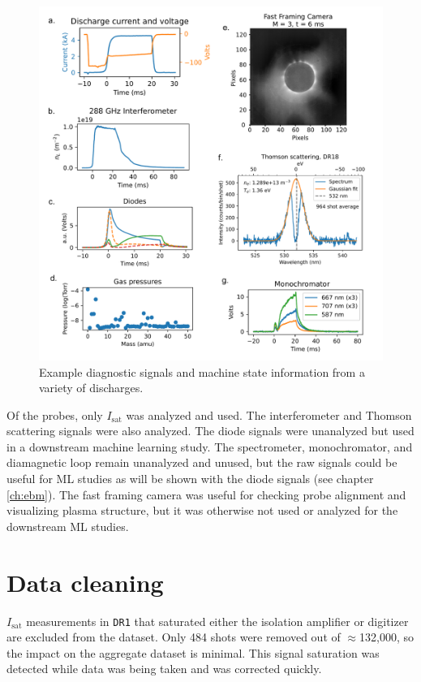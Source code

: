 \begin{figure}
	\centering
	\includegraphics[width=450pt]{figures/diagnostics-examples.pdf}
	\caption[Example machine state information and diagnostic signals]{\label{fig:example-diagnostics-msi}Example diagnostic signals and machine state information from a variety of discharges.}
\end{figure}

Of the probes, only $I_\text{sat}$ was analyzed and used. The interferometer and Thomson scattering signals were also analyzed. The diode signals were unanalyzed but used in a downstream machine learning study. The spectrometer, monochromator, and diamagnetic loop remain unanalyzed and unused, but the raw signals could be useful for ML studies as will be shown with the diode signals (see chapter \ref{ch:ebm}). The fast framing camera was useful for checking probe alignment and visualizing plasma structure, but it was otherwise not used or analyzed for the downstream ML studies.

\section{Data cleaning}

$I_\text{sat}$ measurements in \texttt{DR1} that saturated either the isolation amplifier or digitizer are excluded from the dataset. Only 484 shots were removed out of $\approx$132,000, so the impact on the aggregate dataset is minimal. This signal saturation was detected while data was being taken and was corrected quickly.

